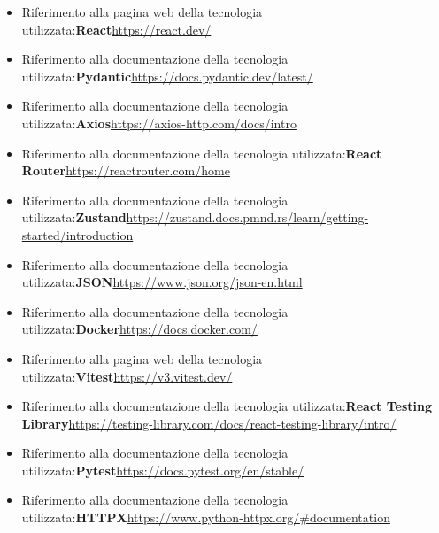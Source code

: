 \documentclass[a4paper,12pt]{article}
\begin{document}
\begin{itemize}
                \item Riferimento alla pagina web della tecnologia utilizzata:\newline \textbf{React}\newline \url{https://react.dev/}
                \item Riferimento alla documentazione della tecnologia utilizzata:\newline \textbf{Pydantic}\newline \url{https://docs.pydantic.dev/latest/}
                \item Riferimento alla documentazione della tecnologia utilizzata:\newline \textbf{Axios}\newline \url{https://axios-http.com/docs/intro}
                \item Riferimento alla documentazione della tecnologia utilizzata:\newline \textbf{React Router}\newline \url{https://reactrouter.com/home}
                \item Riferimento alla documentazione della tecnologia utilizzata:\newline \textbf{Zustand}\newline \url{https://zustand.docs.pmnd.rs/learn/getting-started/introduction}
                \item Riferimento alla documentazione della tecnologia utilizzata:\newline \textbf{JSON}\newline \url{https://www.json.org/json-en.html}
                \item Riferimento alla documentazione della tecnologia utilizzata:\newline \textbf{Docker}\newline \url{https://docs.docker.com/}
                \item Riferimento alla pagina web della tecnologia utilizzata:\newline \textbf{Vitest}\newline \url{https://v3.vitest.dev/}
                \item Riferimento alla documentazione della tecnologia utilizzata:\newline \textbf{React Testing Library}\newline \url{https://testing-library.com/docs/react-testing-library/intro/}
                \item Riferimento alla documentazione della tecnologia utilizzata:\newline \textbf{Pytest}\newline \url{https://docs.pytest.org/en/stable/}
                \item Riferimento alla documentazione della tecnologia utilizzata:\newline \textbf{HTTPX}\newline \url{https://www.python-httpx.org/#documentation}
            \end{itemize}
        
\end{document}
